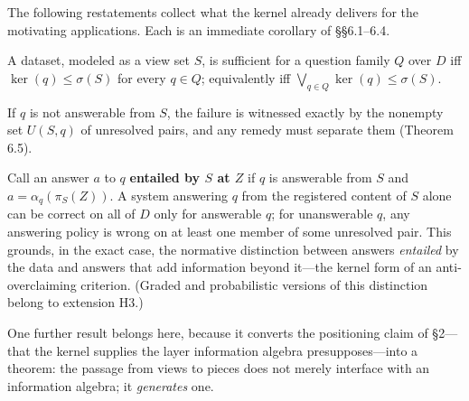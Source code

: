 
The following restatements collect what the kernel already delivers for the motivating applications. Each is an immediate corollary of §§6.1--6.4.

\begin{thmplain}

A dataset, modeled as a view set \(S\), is sufficient for a question family \(Q\) over \(D\) iff \(\ker(q) \le \sigma(S)\) for every \(q \in Q\); equivalently iff \(\bigvee_{q \in Q} \ker(q) \le \sigma(S)\).
\end{thmplain}

\begin{thmplain}

If \(q\) is not answerable from \(S\), the failure is witnessed exactly by the nonempty set \(U(S, q)\) of unresolved pairs, and any remedy must separate them (Theorem 6.5).
\end{thmplain}

\begin{thmplain}

Call an answer \(a\) to \(q\) \textbf{entailed by \(S\) at \(Z\)} if \(q\) is answerable from \(S\) and \(a = \alpha_q(\pi_S(Z))\). A system answering \(q\) from the registered content of \(S\) alone can be correct on all of \(D\) only for answerable \(q\); for unanswerable \(q\), any answering policy is wrong on at least one member of some unresolved pair. This grounds, in the exact case, the normative distinction between answers \emph{entailed} by the data and answers that add information beyond it---\hspace{0pt}the kernel form of an anti-overclaiming criterion. (Graded and probabilistic versions of this distinction belong to extension H3.)
\end{thmplain}

One further result belongs here, because it converts the positioning claim of §2---\hspace{0pt}that the kernel supplies the layer information algebra presupposes---\hspace{0pt}into a theorem: the passage from views to pieces does not merely interface with an information algebra; it \emph{generates} one.

